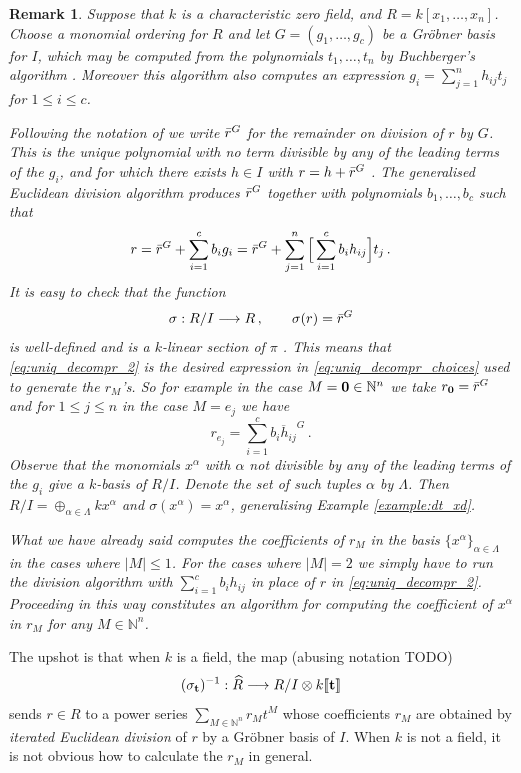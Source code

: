 \documentclass[english,letter paper,12pt,leqno]{article}
\theoremstyle{example}
\newtheorem{remark}[theorem]{Remark}
\numberwithin{equation}{section}
\def\be{\begin{equation}}
\def\ee{\end{equation}}
\begin{document}
\begin{remark}\label{remark:grobner} Suppose that $k$ is a characteristic zero field, and $R = k[x_1,\ldots,x_n]$. Choose a monomial ordering for $R$ and let $G = (g_1,\ldots,g_c)$ be a Gr\"obner basis for $I$, which may be computed from the polynomials $t_1,\ldots,t_n$ by Buchberger's algorithm \cite[\S 2.7]{cox_little_oshea}. Moreover this algorithm also computes an expression $g_i = \sum_{j=1}^n h_{ij} t_j$ for $1 \le i \le c$.

Following the notation of \cite{cox_little_oshea} we write $\Bar{r}^G$ for the remainder on division of $r$ by $G$. This is the unique polynomial with no term divisible by any of the leading terms of the $g_i$, and for which there exists $h \in I$ with $r = h + \Bar{r}^G$ \cite[\S 2.6]{cox_little_oshea}. The generalised Euclidean division algorithm produces $\Bar{r}^G$ together with polynomials $b_1,\ldots,b_c$ such that
\be\label{eq:uniq_decompr_2}
r = \Bar{r}^G + \sum_{i=1}^c b_i g_i = \Bar{r}^G + \sum_{j=1}^n \Big[ \sum_{i=1}^c b_i h_{ij} \Big] t_j\,.
\ee
It is easy to check that the function
\[
\sigma: R/I \longrightarrow R\,, \qquad \sigma(r) = \Bar{r}^G
\]
is well-defined and is a $k$-linear section of $\pi$ \cite[Corollary 2, \S 2.6]{cox_little_oshea}. This means that \eqref{eq:uniq_decompr_2} is the desired expression in \eqref{eq:uniq_decompr_choices} used to generate the $r_M$'s. So for example in the case $M = \bold{0} \in \mathbb{N}^n$ we take $r_{\bold{0}} = \Bar{r}^G$ and for $1 \le j \le n$ in the case $M = e_j$ we have
\[
r_{e_j} = \sum_{i=1}^c \overline{b_i h_{ij} }^G\,.
\]
Observe that the monomials $x^\alpha$ with $\alpha$ not divisible by any of the leading terms of the $g_i$ give a $k$-basis of $R/I$. Denote the set of such tuples $\alpha$ by $\Lambda$. Then $R/I = \oplus_{\alpha \in \Lambda} k x^\alpha$ and $\sigma(x^\alpha) = x^\alpha$, generalising Example \ref{example:dt_xd}. 

What we have already said computes the coefficients of $r_M$ in the basis $\{x^\alpha\}_{\alpha \in \Lambda}$ in the cases where $|M| \le 1$. For the cases where $|M| = 2$ we simply have to run the division algorithm with $\sum_{i=1}^c b_i h_{ij}$ in place of $r$ in \eqref{eq:uniq_decompr_2}. Proceeding in this way constitutes an algorithm for computing the coefficient of $x^\alpha$ in $r_M$ for any $M \in \mathbb{N}^n$.
\end{remark}

The upshot is that when $k$ is a field, the map (abusing notation TODO)
\[
(\sigma_{\bold{t}})^{-1}: \widehat{R} \longrightarrow R/I \otimes k \llbracket \bold{t} \rrbracket
\]
sends $r \in R$ to a power series $\sum_{M \in \mathbb{N}^n} r_M t^M$ whose coefficients $r_M$ are obtained by \emph{iterated Euclidean division} of $r$ by a Gr\"obner basis of $I$. When $k$ is not a field, it is not obvious how to calculate the $r_M$ in general.
\end{document}
